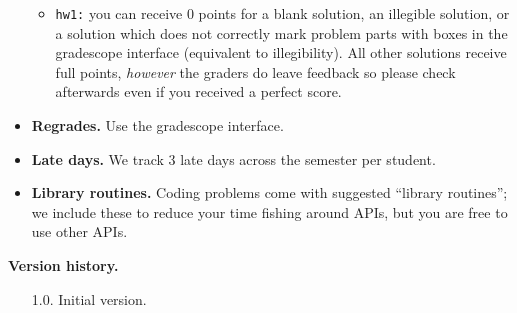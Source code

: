 \documentclass{article}
\theoremstyle{definition}
\theoremstyle{remark}
\begin{document}
\begin{itemize}
\begin{itemize}
        \item
          \texttt{hw1:} you can receive $0$ points for a blank solution, an illegible solution,
          or a solution which does not correctly mark problem parts with boxes in the gradescope
          interface (equivalent to illegibility).
          All other solutions receive full points, \emph{however} the graders do leave feedback
          so please check afterwards even if you received a perfect score.

      \end{itemize}

    \item
      \textbf{Regrades.}  Use the gradescope interface.

    \item
      \textbf{Late days.}
      We track 3 late days across the semester per student.

    \item
      \textbf{Library routines.}
      Coding problems come with suggested ``library routines''; we include these to reduce
      your time fishing around APIs, but you are free to use other APIs.
  \end{itemize}
  \noindent\textbf{Version history.}
  \begin{enumerate}
    \item[1.0.] Initial version.
  \end{enumerate}
\end{document}
